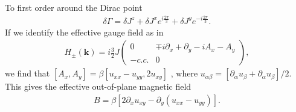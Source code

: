 \documentclass[reprint,amsmath,amssymb,aps,prl,groupedaddress,nofootinbib,superscriptaddress]{revtex4-1}
\newcommand{\1}{\mathds{1}}
\begin{document}
To first order around the Dirac point 
\begin{align}
\delta \Gamma = \delta J^z + \delta J^x e^{i\frac{2\pi}{3}} + \delta J^y e^{-i\frac{2\pi}{3}}.
\end{align}
If we identify the effective gauge field as in %
\begin{align}
H_{\pm}(\mathbf{k}) =  i \frac{3}{2} J
\left(\begin{array}{cc}
0 & \mp i\partial_x + \partial_y - iA_x - A_y  \\
-c.c. & 0
\end{array}\right),
\end{align}
we find that $[A_x,A_y] = \beta [ {u_{xx}-u_{yy}} , 2u_{xy}]$ \cite{Vozmediano10}, where $u_{\alpha \beta} = \left[\partial_\alpha u_\beta + \partial_\alpha u_\beta \right]/2$. %
This gives the effective out-of-plane magnetic field \cite{Zhu15}
\begin{align}\label{B}
B = \beta \left[2\partial_x u_{xy} - \partial_y \left(u_{xx}-u_{yy}\right)\right].
\end{align}
\end{document}
